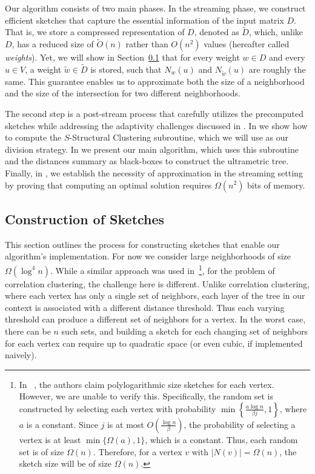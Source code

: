 \documentclass{article}
\begin{document}
\lzerofit*

Our algorithm consists of two main phases. In the streaming phase, we construct efficient sketches 
that capture the essential information of the input matrix $D$. That is, we store a compressed representation of $D$, denoted as $\widetilde{D}$, which, unlike $D$, has a reduced size of $\widetilde{O}(n)$ rather than $O(n^2)$ values (hereafter called \emph{weights}). 
Yet, we will show in Section~\ref{section:sketches} that for every weight $w \in D$ and every $u \in V$, a weight $\tilde{w} \in \widetilde{D}$ is stored, such that $N_w(u)$ and $N_{\tilde{w}}(u)$ are roughly the same. This guarantee enables us to approximate both the size of a neighborhood and the size of the intersection for two different neighborhoods.

The second step is a post-stream process that carefully utilizes the precomputed sketches while addressing the adaptivity challenges discussed in .
In  we show how to compute the $S$-Structural Clustering subroutine, which we will use as our division strategy.
In  we present our main algorithm, which uses this subroutine and the distances summary as black-boxes to construct the ultrametric tree. 
Finally, in , we establish the necessity of approximation in the streaming setting by proving that computing an optimal solution requires $\Omega(n^2)$ bits of memory.

\subsection{Construction of Sketches}\label{section:sketches}
This section outlines the process for constructing sketches that enable our algorithm's implementation. For now we consider large neighborhoods of size $\Omega (\log^4 n)$. 
While a similar approach was used in~\cite{cohen2021correlation}\footnote{In ~\cite{cohen2021correlation}, the authors claim polylogarithmic size sketches for each vertex. However, we are unable to verify this. Specifically, the random set is constructed by selecting each vertex with probability \(\min\left\{\frac{a \log n}{\beta j}, 1\right\}\), where \(a\) is a constant. Since \(j\) is at most \(O\left(\frac{\log n}{\beta}\right)\), the probability of selecting a vertex is at least \(\min\{\Omega(a), 1\}\), which is a constant. Thus, each random set is of size \(\Omega(n)\). Therefore, for a vertex \(v\) with \(|N(v)|=\Omega(n)\), the sketch size will be of size \(\Omega(n)\).}, for the problem of correlation clustering, the challenge here is different. Unlike correlation clustering, where each vertex has only a single set of neighbors, each layer of the tree in our context is associated with a different distance threshold. Thus each varying threshold can produce a different set of neighbors for a vertex. In the worst case, there can be \(n\) such sets, and building a sketch for each changing set of neighbors for each vertex can require up to quadratic space (or even cubic, if implemented naively).
\end{document}
